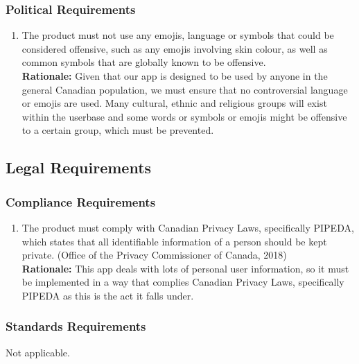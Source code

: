 \documentclass[]{article}
\begin{document}
\subsubsection{Political Requirements}
\label{ssub:political_requirements}
\begin{enumerate}[{CP-P}1. ]
	\item The product must not use any emojis, language or symbols that could be considered offensive, such as any emojis involving skin colour, as well as common symbols that are globally known to be offensive.  \\
	{\bf Rationale:} Given that our app is designed to be used by anyone in the general Canadian population, we must ensure that no controversial language or emojis are used. Many cultural, ethnic and religious groups will exist within the userbase and some words or symbols or emojis might be offensive to a certain group, which must be prevented.
\end{enumerate}


\subsection{Legal Requirements}
\label{sub:legal_requirements}

\subsubsection{Compliance Requirements}
\label{ssub:compliance_requirements}
\begin{enumerate}[{LR-COMP}1. ]
	\item The product must comply with Canadian Privacy Laws, specifically PIPEDA, which states that all identifiable information of a person should be kept private. (Office of the Privacy Commissioner of Canada, 2018)  \\
	{\bf Rationale:} This app deals with lots of personal user information, so it must be implemented in a way that complies Canadian Privacy Laws, specifically PIPEDA as this is the act it falls under.
\end{enumerate}

\subsubsection{Standards Requirements}
\label{ssub:standards_requirements}
 Not applicable.
\end{document}
